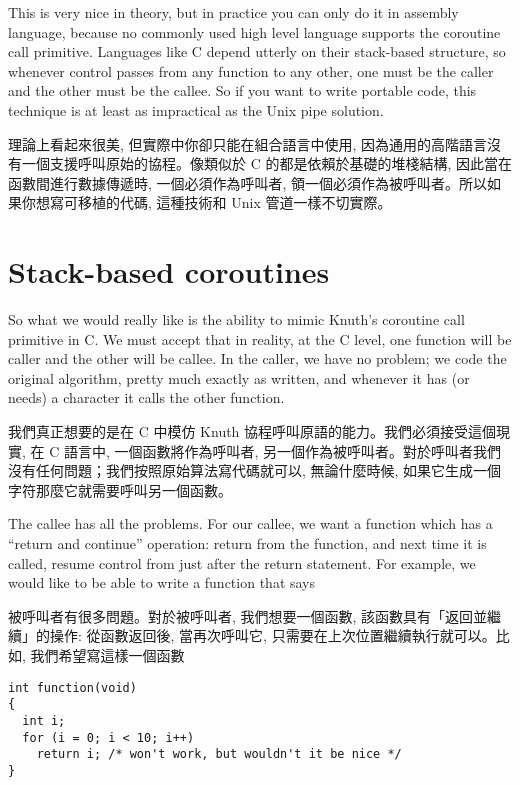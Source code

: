 \documentclass[12pt]{article}
\begin{document}
\begin{CJK}{UTF8}{bsmi}
 This is very nice in theory, but in practice you can only do it in assembly language, because no commonly used high level language supports the coroutine call primitive. Languages like C depend utterly on their stack-based structure, so whenever control passes from any function to any other, one must be the caller and the other must be the callee. So if you want to write portable code, this technique is at least as impractical as the Unix pipe solution.

理論上看起來很美, 但實際中你卻只能在組合語言中使用, 因為通用的高階語言沒有一個支援呼叫原始的協程。像類似於 C 的都是依賴於基礎的堆棧結構, 因此當在函數間進行數據傳遞時, 一個必須作為呼叫者, 領一個必須作為被呼叫者。所以如果你想寫可移植的代碼, 這種技術和 Unix 管道一樣不切實際。

\section{Stack-based coroutines}

So what we would really like is the ability to mimic Knuth's coroutine call primitive in C. We must accept that in reality, at the C level, one function will be caller and the other will be callee. In the caller, we have no problem; we code the original algorithm, pretty much exactly as written, and whenever it has (or needs) a character it calls the other function.

我們真正想要的是在 C 中模仿 Knuth 協程呼叫原語的能力。我們必須接受這個現實, 在 C 語言中, 一個函數將作為呼叫者, 另一個作為被呼叫者。對於呼叫者我們沒有任何問題；我們按照原始算法寫代碼就可以, 無論什麼時候, 如果它生成一個字符那麼它就需要呼叫另一個函數。

The callee has all the problems. For our callee, we want a function which has a ``return and continue'' operation: return from the function, and next time it is called, resume control from just after the return statement. For example, we would like to be able to write a function that says


 被呼叫者有很多問題。對於被呼叫者, 我們想要一個函數, 該函數具有「返回並繼續」的操作: 從函數返回後, 當再次呼叫它, 只需要在上次位置繼續執行就可以。比如, 我們希望寫這樣一個函數 

\begin{lstlisting}[basicstyle=\footnotesize, breaklines=true]
int function(void) 
{
  int i;
  for (i = 0; i < 10; i++)
    return i; /* won't work, but wouldn't it be nice */
}
\end{lstlisting}


\end{CJK}
\end{document}
